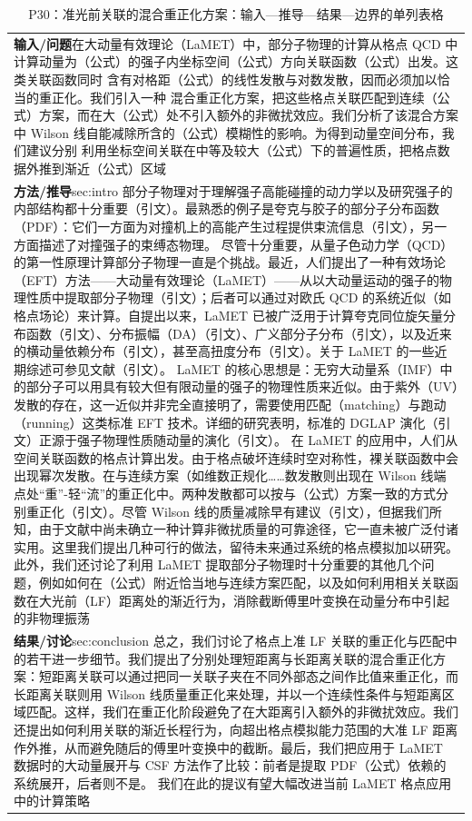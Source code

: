 \documentclass[UTF8,11pt,oneside]{ctexbook}
\begin{document}
\begin{table}[htbp]
  \centering
  \caption*{P30：准光前关联的混合重正化方案：输入—推导—结果—边界的单列表格}
  \small
  \begin{tabular}{@{}p{}@{}}
    \toprule
    \textbf{输入/问题}\quad 在大动量有效理论（LaMET）中，部分子物理的计算从格点 QCD 中计算动量为（公式）的强子内坐标空间（公式）方向关联函数（公式）出发。这类关联函数同时 含有对格距（公式）的线性发散与对数发散，因而必须加以恰当的重正化。我们引入一种 混合重正化方案，把这些格点关联匹配到连续（公式）方案，而在大（公式）处不引入额外的非微扰效应。我们分析了该混合方案中 Wilson 线自能减除所含的（公式）模糊性的影响。为得到动量空间分布，我们建议分别 利用坐标空间关联在中等及较大（公式）下的普遍性质，把格点数据外推到渐近（公式）区域 \\
    \textbf{方法/推导}\quad sec:intro 部分子物理对于理解强子高能碰撞的动力学以及研究强子的内部结构都十分重要（引文）。最熟悉的例子是夸克与胶子的部分子分布函数（PDF）：它们一方面为对撞机上的高能产生过程提供束流信息（引文），另一方面描述了对撞强子的束缚态物理。 尽管十分重要，从量子色动力学（QCD）的第一性原理计算部分子物理一直是个挑战。最近，人们提出了一种有效场论（EFT）方法——大动量有效理论（LaMET）——从以大动量运动的强子的物理性质中提取部分子物理（引文）；后者可以通过对欧氏 QCD 的系统近似（如格点场论）来计算。自提出以来，LaMET 已被广泛用于计算夸克同位旋矢量分布函数（引文）、分布振幅（DA）（引文）、广义部分子分布（引文），以及近来的横动量依赖分布（引文），甚至高扭度分布（引文）。关于 LaMET 的一些近期综述可参见文献（引文）。 LaMET 的核心思想是：无穷大动量系（IMF）中的部分子可以用具有较大但有限动量的强子的物理性质来近似。由于紫外（UV）发散的存在，这一近似并非完全直接明了，需要使用匹配（matching）与跑动（running）这类标准 EFT 技术。详细的研究表明，标准的 DGLAP 演化（引文）正源于强子物理性质随动量的演化（引文）。 在 LaMET 的应用中，人们从空间关联函数的格点计算出发。由于格点破坏连续时空对称性，裸关联函数中会出现幂次发散。在与连续方案（如维数正规化……数发散则出现在 Wilson 线端点处``重''-轻``流''的重正化中。两种发散都可以按与（公式）方案一致的方式分别重正化（引文）。尽管 Wilson 线的质量减除早有建议（引文），但据我们所知，由于文献中尚未确立一种计算非微扰质量的可靠途径，它一直未被广泛付诸实用。这里我们提出几种可行的做法，留待未来通过系统的格点模拟加以研究。 此外，我们还讨论了利用 LaMET 提取部分子物理时十分重要的其他几个问题，例如如何在（公式）附近恰当地与连续方案匹配，以及如何利用相关关联函数在大光前（LF）距离处的渐近行为，消除截断傅里叶变换在动量分布中引起的非物理振荡 \\
    \textbf{结果/讨论}\quad sec:conclusion 总之，我们讨论了格点上准 LF 关联的重正化与匹配中的若干进一步细节。我们提出了分别处理短距离与长距离关联的混合重正化方案：短距离关联可以通过把同一关联子夹在不同外部态之间作比值来重正化，而长距离关联则用 Wilson 线质量重正化来处理，并以一个连续性条件与短距离区域匹配。这样，我们在重正化阶段避免了在大距离引入额外的非微扰效应。我们还提出如何利用关联的渐近长程行为，向超出格点模拟能力范围的大准 LF 距离作外推，从而避免随后的傅里叶变换中的截断。最后，我们把应用于 LaMET 数据时的大动量展开与 CSF 方法作了比较：前者是提取 PDF（公式）依赖的系统展开，后者则不是。 我们在此的提议有望大幅改进当前 LaMET 格点应用中的计算策略 \\

\end{tabular}
\end{table}
\end{document}
